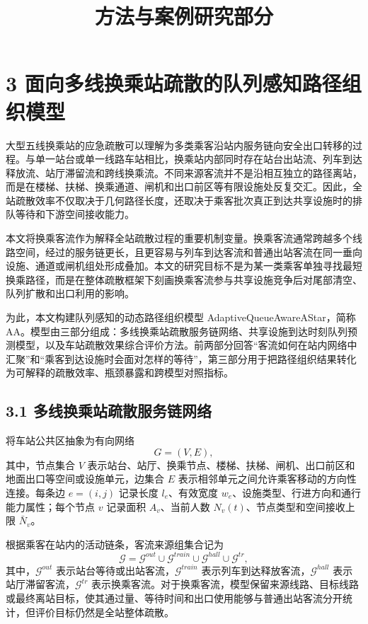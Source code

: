 \documentclass[UTF8,a4paper,12pt]{ctexart}
\title{方法与案例研究部分}
\author{}
\date{}
\begin{document}
\maketitle

\section{3 面向多线换乘站疏散的队列感知路径组织模型}

大型五线换乘站的应急疏散可以理解为多类乘客沿站内服务链向安全出口转移的过程。与单一站台或单一线路车站相比，换乘站内部同时存在站台出站流、列车到达释放流、站厅滞留流和跨线换乘流。不同来源客流并不是沿相互独立的路径离站，而是在楼梯、扶梯、换乘通道、闸机和出口前区等有限设施处反复交汇。因此，全站疏散效率不仅取决于几何路径长度，还取决于乘客批次真正到达共享设施时的排队等待和下游空间接收能力。

本文将换乘客流作为解释全站疏散过程的重要机制变量。换乘客流通常跨越多个线路空间，经过的服务链更长，且更容易与列车到达客流和普通出站客流在同一垂向设施、通道或闸机组处形成叠加。本文的研究目标不是为某一类乘客单独寻找最短换乘路径，而是在整体疏散框架下刻画换乘客流参与共享设施竞争后对尾部清空、队列扩散和出口利用的影响。

为此，本文构建队列感知的动态路径组织模型 AdaptiveQueueAwareAStar，简称 AA。模型由三部分组成：多线换乘站疏散服务链网络、共享设施到达时刻队列预测模型，以及车站疏散效果综合评价方法。前两部分回答“客流如何在站内网络中汇聚”和“乘客到达设施时会面对怎样的等待”，第三部分用于把路径组织结果转化为可解释的疏散效率、瓶颈暴露和跨模型对照指标。

\subsection{3.1 多线换乘站疏散服务链网络}

将车站公共区抽象为有向网络
\[
G=(V,E),
\]
其中，节点集合 \(V\) 表示站台、站厅、换乘节点、楼梯、扶梯、闸机、出口前区和地面出口等空间或设施单元，边集合 \(E\) 表示相邻单元之间允许乘客移动的方向性连接。每条边 \(e=(i,j)\) 记录长度 \(l_e\)、有效宽度 \(w_e\)、设施类型、行进方向和通行能力属性；每个节点 \(v\) 记录面积 \(A_v\)、当前人数 \(N_v(t)\)、节点类型和空间接收上限 \(\bar N_v\)。

根据乘客在站内的活动链条，客流来源组集合记为
\[
\mathcal{G}=\mathcal{G}^{out}\cup\mathcal{G}^{train}\cup\mathcal{G}^{hall}\cup\mathcal{G}^{tr},
\]
其中，\(\mathcal{G}^{out}\) 表示站台等待或出站客流，\(\mathcal{G}^{train}\) 表示列车到达释放客流，\(\mathcal{G}^{hall}\) 表示站厅滞留客流，\(\mathcal{G}^{tr}\) 表示换乘客流。对于换乘客流，模型保留来源线路、目标线路或最终离站目标，使其通过量、等待时间和出口使用能够与普通出站客流分开统计，但评价目标仍然是全站整体疏散。
\end{document}
